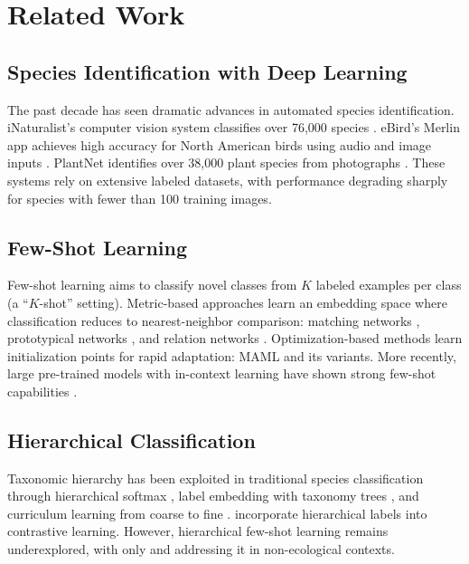 \section{Related Work}

\label{sec:related}

\subsection{Species Identification with Deep Learning}

The past decade has seen dramatic advances in automated species
identification. iNaturalist's computer vision system classifies over
76{,}000 species \citep{van2021benchmarking}. eBird's Merlin app
achieves high accuracy for North American birds using audio and image
inputs \citep{kahl2021birdnet}. PlantNet identifies over 38{,}000 plant
species from photographs \citep{goeau2022overview}. These systems rely
on extensive labeled datasets, with performance degrading sharply for
species with fewer than 100 training images.

\subsection{Few-Shot Learning}

Few-shot learning aims to classify novel classes from $K$ labeled
examples per class (a ``$K$-shot'' setting). Metric-based approaches
learn an embedding space where classification reduces to nearest-neighbor
comparison: matching networks \citep{vinyals2016matching}, prototypical
networks \citep{snell2017prototypical}, and relation networks
\citep{sung2018learning}. Optimization-based methods learn
initialization points for rapid adaptation: MAML \citep{finn2017model}
and its variants. More recently, large pre-trained models with
in-context learning have shown strong few-shot capabilities
\citep{brown2020language}.

\subsection{Hierarchical Classification}

Taxonomic hierarchy has been exploited in traditional species
classification through hierarchical softmax \citep{deng2014large},
label embedding with taxonomy trees \citep{akata2015label}, and
curriculum learning from coarse to fine \citep{bengio2009curriculum}.
\citet{chang2021your} incorporate hierarchical labels into contrastive
learning. However, hierarchical few-shot learning remains
underexplored, with only \citet{li2019large} and
\citet{liu2020many} addressing it in non-ecological contexts.

